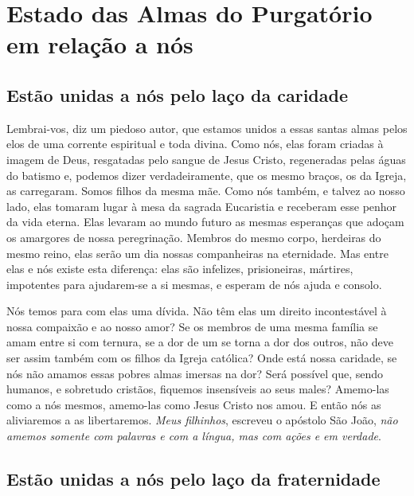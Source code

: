 \renewcommand{\thechapterdisplay}{Décimo segundo dia}
\renewcommand{\thechapterrunner}{Estado das Almas do Purgatório em relação a nós}
\chapter[Décimo segundo dia --- Estado das Almas do Purgatório em relação a nós]{Estado das Almas do Purgatório em relação a nós}
\section*{Estão unidas a nós pelo laço da caridade}

Lembrai-vos, diz um piedoso autor, que estamos unidos a essas santas almas pelos elos de uma corrente espiritual e toda divina. Como nós, elas foram criadas à imagem de Deus, resgatadas pelo sangue de Jesus Cristo, regeneradas pelas águas do batismo e, podemos dizer verdadeiramente, que os mesmo braços, os da Igreja, as carregaram. Somos filhos da mesma mãe. Como nós também, e talvez ao nosso lado, elas tomaram lugar à mesa da sagrada Eucaristia e receberam esse penhor da vida eterna. Elas levaram ao mundo futuro as mesmas esperanças que adoçam os amargores de nossa peregrinação. Membros do mesmo corpo, herdeiras do mesmo reino, elas serão um dia nossas companheiras na eternidade. Mas entre elas e nós existe esta diferença: elas são infelizes, prisioneiras, mártires, impotentes para ajudarem-se a si mesmas, e esperam de nós ajuda e consolo. 

Nós temos para com elas uma dívida. Não têm elas um direito incontestável à nossa compaixão e ao nosso amor? Se os membros de uma mesma família se amam entre si com ternura, se a dor de um se torna a dor dos outros, não deve ser assim também com os filhos da Igreja católica? Onde está nossa caridade, se nós não amamos essas pobres almas imersas na dor? Será possível que, sendo humanos, e sobretudo cristãos, fiquemos insensíveis ao seus males? Amemo-las como a nós mesmos, amemo-las como Jesus Cristo nos amou. E então nós as aliviaremos a as libertaremos. \textit{Meus filhinhos}, escreveu o apóstolo São João, \textit{não amemos somente com palavras e com a língua, mas com ações e em verdade}.


\section*{Estão unidas a nós pelo laço da fraternidade}


